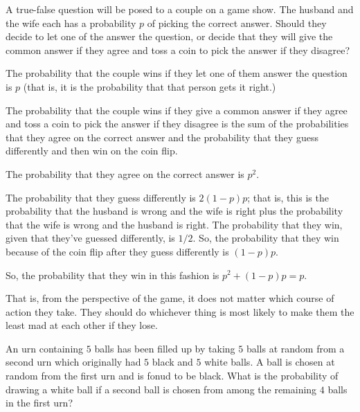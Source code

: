 \begin{problem}[Handout 4, \# 12]
  A true-false question will be posed to a couple on a game show. The
  husband and the wife each has a probability \(p\) of picking the correct
  answer. Should they decide to let one of the answer the question, or
  decide that they will give the common answer if they agree and toss a
  coin to pick the answer if they disagree?
\end{problem}
\begin{solution}

The probability that the couple wins if they let one of them answer the question is $p$ (that is, it is the probability that that person gets it right.)

The probability that the couple wins if they give a common answer if they agree and toss a coin to pick the answer if they disagree is the sum of the probabilities that they agree on the correct answer and the probability that they guess differently and then win on the coin flip.

The probability that they agree on the correct answer is $p^2$.

The probability that they guess differently is $2(1-p)p$; that is, this is the probability that the husband is wrong and the wife is right plus the probability that the wife is wrong and the husband is right. The probability that they win, given that they've guessed differently, is $1/2$. So, the probability that they win because of the coin flip after they guess differently is $(1-p)p$.

So, the probability that they win in this fashion is $p^2 + (1-p)p = p$.

That is, from the perspective of the game, it does not matter which course of action they take. They should do whichever thing is most likely to make them the least mad at each other if they lose.

\end{solution}
\newpage

\begin{problem}[Handout 4, \# 13]
  An urn containing \(5\) balls has been filled up by taking \(5\) balls at
  random from a second urn which originally had \(5\) black and \(5\) white
  balls. A ball is chosen at random from the first urn and is fonud to be
  black. What is the probability of drawing a white ball if a second ball
  is chosen from among the remaining \(4\) balls in the first urn?
\end{problem}
\begin{solution}

\end{solution}
\newpage

